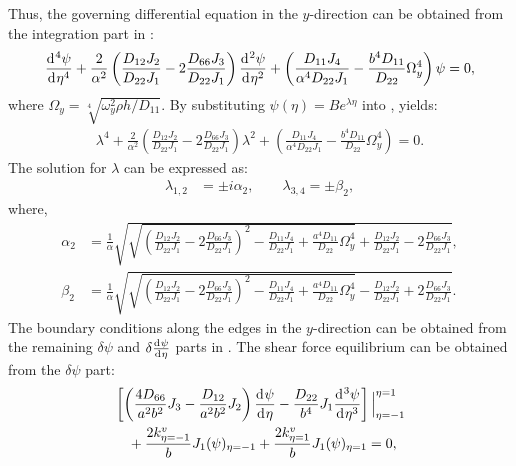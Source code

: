 \documentclass[preprint,12pt]{elsarticle}
\newcommand{\id}{\mathrm{d}\mkern1mu}
\begin{document}
%
Thus, the governing differential equation in the \( y \)-direction can be obtained from the integration part in :
%
\begin{equation}\label{eq:ODEy}
		\frac{\id^4 \psi}{\id \eta^4} + \frac{2}{\alpha^2}\left(\frac{D_{12}J_2}{D_{22}J_1} - 2\frac{D_{66}J_3}{D_{22}J_1}\right)\frac{\id^2 \psi}{\id \eta^2} + \left( \frac{D_{11}J_4}{\alpha^4D_{22}J_1} - \frac{b^4D_{11}}{D_{22}} \Omega_y^4 \right) \psi = 0,
\end{equation}
%
where \( \Omega_y = \sqrt[4]{{\omega_y^2 \rho h}/D_{11}} \).
By substituting \( \psi(\eta) = B e^{\lambda \eta} \) into , yields:
%
\begin{equation}\label{eq:ODEy2}
	\begin{split}
		\lambda^4 + \frac{2}{\alpha^2} \left( \frac{D_{12}J_2}{D_{22}J_1} - 2\frac{D_{66}J_3}{D_{22}J_1} \right) \lambda^2 + \left( \frac{D_{11}J_4}{\alpha^4D_{22}J_1} - \frac{b^4D_{11}}{D_{22}} \Omega_y^4 \right) = 0.
	\end{split}
\end{equation}
%
The solution for \( \lambda \) can be expressed as:
%
\begin{equation}\label{eq:lambda}
	\begin{split}
		\lambda_{1,2} &= \pm \textit{i} \alpha_2, \qquad \lambda_{3,4} = \pm \beta_2,
	\end{split}
\end{equation}
%
where,
%
\begin{subequations}\label{eq:beta}
	\begin{align}
		\alpha_2 &= \frac{1}{\alpha} \sqrt{ \sqrt{ \left( \frac{D_{12}J_2}{D_{22}J_1} - 2\frac{D_{66}J_3}{D_{22}J_1} \right)^2 - \frac{D_{11}J_4}{D_{22}J_1} + \frac{a^4 D_{11}}{D_{22}} \Omega_y^4 } + \frac{D_{12}J_2}{D_{22}J_1} - 2 \frac{D_{66}J_3}{D_{22}J_1}}, \\
		\beta_2 &= \frac{1}{\alpha} \sqrt{ \sqrt{ \left( \frac{D_{12}J_2}{D_{22}J_1} - 2 \frac{D_{66}J_3}{D_{22}J_1} \right)^2 - \frac{D_{11}J_4}{D_{22}J_1} + \frac{a^4 D_{11}}{D_{22}} \Omega_y^4 } - \frac{D_{12}J_2}{D_{22}J_1} + 2 \frac{D_{66}J_3}{D_{22}J_1}}.
	\end{align}
\end{subequations}
%
The boundary conditions along the edges in the \( y \)-direction can be obtained from the remaining \( \delta \psi \) and \( \delta \frac{\id \psi}{\id \eta} \) parts in . 
The shear force equilibrium can be obtained from the \( \delta \psi \) part:
%
\begin{equation}\label{eq:inertial_forcey}
	\begin{split}
		& \left[ \left( \frac{4D_{66}}{a^2b^2} J_3 - \frac{D_{12}}{a^2b^2} J_2 \right) \frac{\id \psi}{\id \eta} 
		- \frac{D_{22}}{b^4} J_1 \frac{\id^3 \psi}{\id \eta^3} \right] \Big|^{\eta=1}_{\eta=-1} \\
		&\quad + \frac{2k^v_{\eta=-1}}{b} J_1 (\psi )_{\eta=-1} + \frac{2k^v_{\eta=1}}{b} J_1 (\psi )_{\eta=1} = 0,
	\end{split}
\end{equation}
\end{document}
